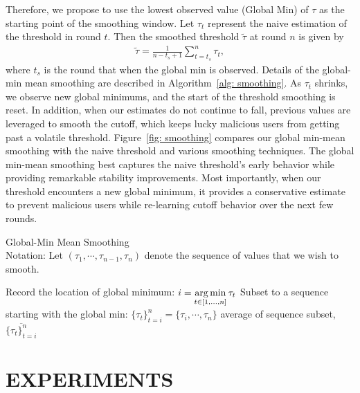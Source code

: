 \documentclass{article} %
\newcommand{\yli}[1]{{\color{cyan}#1}}
\begin{document}
Therefore, we propose to use the lowest observed value (Global Min) of $\tau$ as the starting point of the smoothing window. Let $\tau_t$ represent the naive estimation of the threshold in round $t$. Then the smoothed threshold $\tilde{\tau}$ at round $n$ is given by
\begin{align*}
    \tilde{\tau} = \frac{1}{n-t_s+1}\sum_{t=t_s}^n \tau_t,
\end{align*}
where $t_s$ is the round that when the global min is observed. Details of the global-min mean smoothing are described in Algorithm~\ref{alg: smoothing}. As $\tau_t$ shrinks, we observe new global minimums, and the start of the threshold smoothing is reset.  In addition, when our estimates do not continue to fall, previous values are leveraged to smooth the cutoff, which keeps lucky malicious users from getting past a volatile threshold. Figure~\ref{fig: smoothing} compares our global min-mean smoothing with the naive threshold and various smoothing techniques. The global min-mean smoothing best captures the naive threshold's early behavior while providing remarkable stability improvements. Most importantly, when our threshold encounters a new global minimum, it provides a conservative estimate to prevent malicious users while re-learning cutoff behavior over the next few rounds.

\begin{algorithm}[H]
\caption{Global-Min Mean Smoothing \\ 
Notation: Let $(\tau_1, \cdots, \tau_{n - 1}, \tau_n)$ denote the sequence of values that we wish to smooth.
}
\label{alg: smoothing}
\begin{algorithmic}[1]

        \State Record the location of global minimum: $i = \operatorname*{arg\,min}\limits_{t \in [1,...,n] } \tau_t$
        \State Subset to a sequence starting with the global min: $\{\tau_t\}_{t=i}^n = \{\tau_i, \cdots, \tau_n \}$
        \State \Return average of sequence subset, $\overline{\{\tau_t\}_{t=i}^n}$
    \EndProcedure
\end{algorithmic}
\end{algorithm}

\vspace{-5pt}
\section{EXPERIMENTS}

\end{document}
